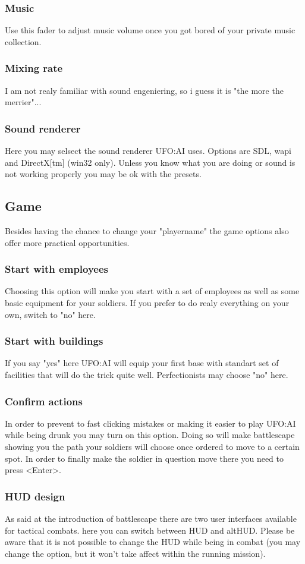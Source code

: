 \subsubsection*{Music}
Use this fader to adjust music volume once you got bored of your private music collection.
\subsubsection*{Mixing rate}
I am not realy familiar with sound engeniering, so i guess it is "the more the merrier"...
\subsubsection*{Sound renderer}
Here you may selsect the sound renderer UFO:AI uses. Options are SDL, wapi and DirectX[tm] (win32 only). Unless you know what you are doing or sound is not working properly you may be ok with the presets.

\subsection{Game}
Besides having the chance to change your "playername" the game options also offer more practical opportunities.
\subsubsection*{Start with employees}
Choosing this option will make you start with a set of employees as well as some basic equipment for your soldiers. If you prefer to do realy everything on your own, switch to "no" here.
\subsubsection*{Start with buildings}
If you say "yes" here UFO:AI will equip your first base with standart set of facilities that will do the trick quite well. Perfectionists may choose "no" here.
\subsubsection*{Confirm actions}
In order to prevent to fast clicking mistakes or making it easier to play UFO:AI while being drunk you may turn on this option. Doing so will make battlescape showing you the path your soldiers will choose once ordered to move to a certain spot. In order to finally make the soldier in question move there you need to press <Enter>.
\subsubsection*{HUD design}
As said at the introduction of battlescape there are two user interfaces available for tactical combats. here you can switch between HUD and altHUD. Please be aware that it is not possible to change the HUD while being in combat (you may change the option, but it won't take affect within the running mission).
